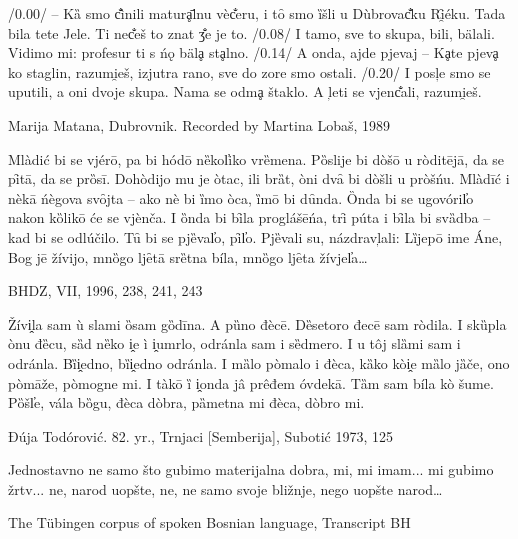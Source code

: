 \begin{exe}
\ex\label{(7.1)}
 /0.00/ – Kȁ smo c̐ìnili maturḁ̄lnu vèc̐eru, i tȏ smo ȉšli u Dùbrovac̐ku Rȋ̯éku. Tada bila tete Jele. Ti nec̐eš to znat ʒ̐e je to. /0.08/ I tamo, sve to skupa, bili, bälali. Vidimo mi: profesur ti s ńǫ bälḁ stḁlno. /0.14/ A onda, ajde pjevaj – Kḁte pjevḁ ko staglin, razumi̯eš, izjutra rano, sve do zore smo ostali. /0.20/ I posļe smo se uputili, a oni dvoje skupa. Nama se odmḁ štaklo. A l̦eti se vjenc̐ali, razumi̯eš.
\begin{flushright}Marija Matana, Dubrovnik. Recorded by Martina Lobaš, 1989 \\ \citep[70]{MenacCelinic12}\end{flushright}
\ex
\label{(7.2)} Mlàdić bi se vjérō, pa bi hódō nȅkol̕iko vrȅmena. Pȍslije bi dòšō u ròditējā, da se pȋtā, da se prȍsī. Dohòdijo mu je òtac, ili brȁt, òni dvȃ bi dòšli u pròšńu. Mlàdīć i nèkā ńègova svȏjta – ako nè bi ȉmo òca, ȉmō bi dȗnda. Ȍnda bi se ugovóril̕o nakon kȍlikō će se vjènča. I ȍnda bi bȋla proglášēńa, trȋ púta i bȋla bi svȁdba – kad bi se odlúčilo. Tȗ bi se pjȅval̕o, pȋl̕o. Pjȅvali su, názdravl̦ali: Lȉjepō ime Áne, Bog jē žívijo, mnȍgo ljȇtā srȅtna bíla, mnȍgo ljȇta žívjel̕a…
\begin{flushright}BHDZ, VII, 1996, 238, 241, 243  \\ \citep[113f]{Lisac03}\end{flushright}
\ex
\label{(7.3)} Žívi̭la sam ù slami ȍsam gȍdīna. A pȕno đècē. Dȅsetoro đecē sam ròdila. I skȕpla ònu đȅcu, sȁd nȅko i̭e ì i̭umrlo, odránla sam i sȅdmero. I u tôj slȁmi sam i odránla. Bȉi̭edno, bȉi̭edno odránla. I mȁlo pòmalo i đèca, kȁko kòi̭e mȁlo jȁče, ono pòmāže, pòmogne mi. I tàkō ȉ i̭onda jâ prêđem óvdekā. Tȁm sam bíla kò šume. Pȍšl̕e, vála bȍgu, đèca dòbra, pȁmetna mi đèca, dòbro mi.\\
\begin{flushright} Đúja Todórović. 82. yr., Trnjaci [Semberija], Subotić 1973, 125  \\ \citep[109]{Okuka08}\end{flushright}
\ex\label{(7.4)} 
	Jednostavno ne samo što gubimo materijalna dobra, mi, mi imam... mi gubimo žrtv... ne, narod uopšte, ne, ne samo svoje bližnje, nego uopšte narod…
\begin{flushright}  The Tübingen corpus of spoken Bosnian language, Transcript BH\end{flushright}
\end{exe}

